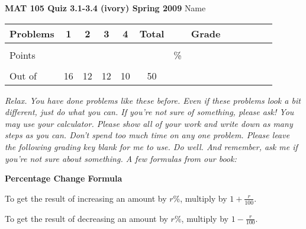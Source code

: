 \documentclass[12pt]{article}
\begin{document}
{\bf MAT 105 Quiz 3.1-3.4 (ivory) Spring 2009} \hspace{.4in} {\large Name} \hrulefill

\hrulefill


\begin{center}

\begin{tabular}
{|l|c|c|c|c|c|c|c|c|c|c|c|c|} \hline

 Problems & \hspace{5 pt} 1 \hspace{5 pt}  & \hspace{5 pt} 2 \hspace{5 pt} & \hspace{5 pt} 3 \hspace{5 pt} & \hspace{5 pt} 4 \hspace{5 pt} &  \hspace{5 pt} Total  \hspace{5 pt} & &  \hspace{5 pt} Grade \hspace{5 pt}  \\ \hline
&&&&& &&\\  
Points &&&&& &    \hspace{.8in}\% &  \\ 
&&&&& && \\  \hline
Out of & 16 & 12  & 12 & 10 &50 & & \\ \hline

\end {tabular}
 
\end{center}

 \emph{Relax.  You have done problems like these before.  Even if these problems look a bit different, just do what you can.  If you're not sure of something, please ask! You may use your calculator.  Please show all of your work and write down as many steps as you can.  Don't spend too much time on any one problem.  Please leave the following grading key blank for me to use.  Do well.  And remember, ask me if you're not sure about something. A few formulas from our book:}
  \vspace{.2in}
 
  \begin{center}
\textbf{Percentage Change Formula}
\vspace{.1in}

To get the result of increasing an amount by $r$\%, multiply by $1+\frac{r}{100}.$
\vspace{.1in}

To get the result of decreasing an amount by $r$\%, multiply by $1-\frac{r}{100}.$
 \end{center}
 
\end{document}
